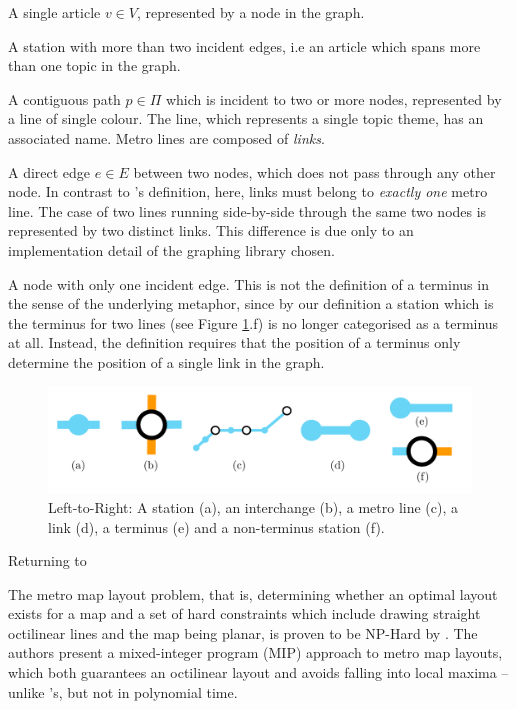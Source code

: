 \begin{description}[leftmargin=7em,style=nextline]
	\item [Station] A single article $v \in V$, represented by a node in the graph.
	\item [Interchange] A station with more than two incident edges, i.e an article which spans more than one topic in the graph.
	\item [Metro Line] A contiguous path $p \in \Pi$ which is incident to two or more nodes, represented by a line of single colour. The line, which represents a single topic theme, has an associated name. Metro lines are composed of \textit{links}.
	\item [Link] A direct edge $e \in E$ between two nodes, which does not pass through any other node. In contrast to \citeauthor{GeneratingInformationMaps}'s definition, here, links must belong to \textit{exactly one} metro line. The case of two lines running side-by-side through the same two nodes is represented by two distinct links. This difference is due only to an implementation detail of the graphing library chosen.
	\item [Terminus] A node with only one incident edge. This is not the definition of a terminus in the sense of the underlying metaphor, since by our definition a station which is the terminus for two lines (see Figure \ref{fig:mapdefinitions}.f) is no longer categorised as a terminus at all. Instead, the definition requires that the position of a terminus only determine the position of a single link in the graph.
\end{description}
\begin{figure}[htbp!]
	\centering
	\includegraphics[width=\textwidth]{img/implementation/mapdefinitions.pdf}
	\caption{Left-to-Right: A station (a), an interchange (b), a metro line (c), a link (d), a terminus (e) and a non-terminus station (f).}
	\label{fig:mapdefinitions}
\end{figure}

Returning to 

The metro map layout problem, that is, determining whether an optimal layout exists for a map and a set of hard constraints which include drawing straight octilinear lines and the map being planar, is proven to be NP-Hard by \cite{AutomatedDrawingOfMetroMaps}. The authors present a mixed-integer program (MIP) approach to metro map layouts, which both guarantees an octilinear layout and avoids falling into local maxima  -- unlike \citeauthor{AutomaticMetroMapLayoutThesis}'s, but not in polynomial time.



